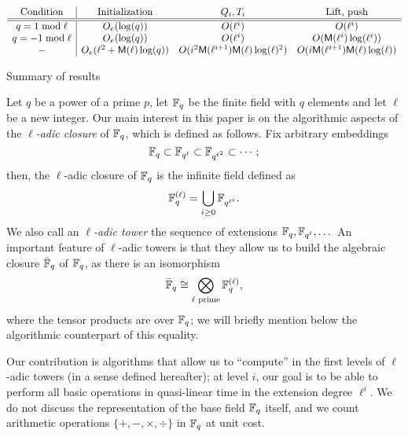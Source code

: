 \documentclass{sig-alternate}
\begin{document}
\begin{table*}[!t]
$$
\begin{array}{c|cccc}
  \text{Condition} & \text{Initialization} & Q_i, T_i & \text{Lift, push}\\
  \hline \hline
  q = 1 \bmod \ell & O_e(\log(q))  & O(\ell^i) & O(\ell^i) \\
  q = -1 \bmod \ell & O_e(\log(q)) & O(\ell^i) & O(\mathsf{M}(\ell^i) \log(\ell^i)) \\
  - & O_e (\ell^2+\mathsf{M}(\ell) \log(q)) & O(i^2\mathsf{M}(\ell^{i+1})\mathsf{M}(\ell)\log(\ell)^2) & O(i \mathsf{M}(\ell^{i+1})\mathsf{M}(\ell)\log(\ell))
\end{array}
$$
\label{table:main}
\caption{Summary of results}
\end{table*}

Let $q$ be a power of a prime $p$, let $\mathbb{F}_q$ be the finite field with
$q$ elements and let $\ell$ be a new integer. Our main interest in
this paper is on the algorithmic aspects of the \emph{$\ell$-adic
  closure} of $\mathbb{F}_q$, which is defined as follows. Fix arbitrary
embeddings
\begin{equation*}
  \mathbb{F}_q \subset \mathbb{F}_{q^\ell} \subset \mathbb{F}_{q^{\ell^2}} \subset \cdots;
\end{equation*}
then, the $\ell$-adic closure of $\mathbb{F}_q$ is the infinite field defined as
\begin{equation*}
  \mathbb{F}_q^{(\ell)} = \bigcup_{i\ge 0}\mathbb{F}_{q^{\ell^i}}.
\end{equation*}
We also call an \emph{$\ell$-adic tower} the sequence of extensions
$\mathbb{F}_q,\mathbb{F}_{q^\ell},\dots$ An important feature of $\ell$-adic towers is
that they allow us to build the algebraic closure $\bar{\mathbb{F}}_q$ of
$\mathbb{F}_q$, as there is an isomorphism
\begin{equation}
  \label{eq:tensor}
  \bar{\mathbb{F}}_q \cong \bigotimes_{\ell\text{ prime}} \mathbb{F}_q^{(\ell)},
\end{equation}
where the tensor products are over $\mathbb{F}_q$; we will briefly mention
below the algorithmic counterpart of this equality.

Our contribution is algorithms that allow us to ``compute'' in the
first levels of $\ell$-adic towers (in a sense defined hereafter); at
level $i$, our goal is to be able to perform all basic operations in
quasi-linear time in the extension degree $\ell^i$.  We do not discuss
the representation of the base field $\mathbb{F}_q$ itself, and we count
arithmetic operations $\{+,-,\times,\div\}$ in $\mathbb{F}_q$ at unit cost.
\end{document}
